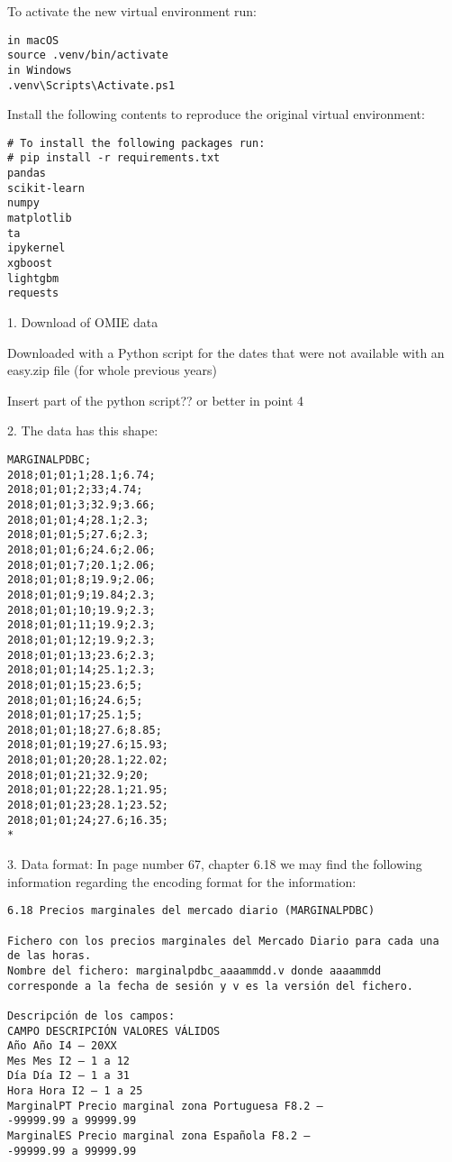 \documentclass[12pt]{report} %
\begin{document}
To activate the new virtual environment run:
\begin{verbatim}
in macOS
source .venv/bin/activate
in Windows
.venv\Scripts\Activate.ps1
\end{verbatim}

Install the following contents to reproduce the original virtual environment:
\begin{verbatim}
# To install the following packages run:
# pip install -r requirements.txt 
pandas
scikit-learn
numpy
matplotlib
ta
ipykernel
xgboost
lightgbm
requests
\end{verbatim}

1. Download of OMIE data
\cite{omie_datos}

Downloaded with a Python script for the dates that were not available with an easy.zip file (for whole previous years)

Insert part of the python script?? or better in point 4


2. The data has this shape:
\begin{verbatim}
MARGINALPDBC;
2018;01;01;1;28.1;6.74;
2018;01;01;2;33;4.74;
2018;01;01;3;32.9;3.66;
2018;01;01;4;28.1;2.3;
2018;01;01;5;27.6;2.3;
2018;01;01;6;24.6;2.06;
2018;01;01;7;20.1;2.06;
2018;01;01;8;19.9;2.06;
2018;01;01;9;19.84;2.3;
2018;01;01;10;19.9;2.3;
2018;01;01;11;19.9;2.3;
2018;01;01;12;19.9;2.3;
2018;01;01;13;23.6;2.3;
2018;01;01;14;25.1;2.3;
2018;01;01;15;23.6;5;
2018;01;01;16;24.6;5;
2018;01;01;17;25.1;5;
2018;01;01;18;27.6;8.85;
2018;01;01;19;27.6;15.93;
2018;01;01;20;28.1;22.02;
2018;01;01;21;32.9;20;
2018;01;01;22;28.1;21.95;
2018;01;01;23;28.1;23.52;
2018;01;01;24;27.6;16.35;
*
\end{verbatim}

3. Data format: In page number 67, chapter 6.18 we may find the following information regarding the encoding format for the information: 
\cite{omie_formatos_2024}
\begin{verbatim}
6.18 Precios marginales del mercado diario (MARGINALPDBC)

Fichero con los precios marginales del Mercado Diario para cada una
de las horas.
Nombre del fichero: marginalpdbc_aaaammdd.v donde aaaammdd
corresponde a la fecha de sesión y v es la versión del fichero.

Descripción de los campos:
CAMPO DESCRIPCIÓN VALORES VÁLIDOS
Año Año I4 – 20XX
Mes Mes I2 – 1 a 12
Día Día I2 – 1 a 31
Hora Hora I2 – 1 a 25
MarginalPT Precio marginal zona Portuguesa F8.2 –
-99999.99 a 99999.99
MarginalES Precio marginal zona Española F8.2 –
-99999.99 a 99999.99
\end{verbatim}
\end{document}
